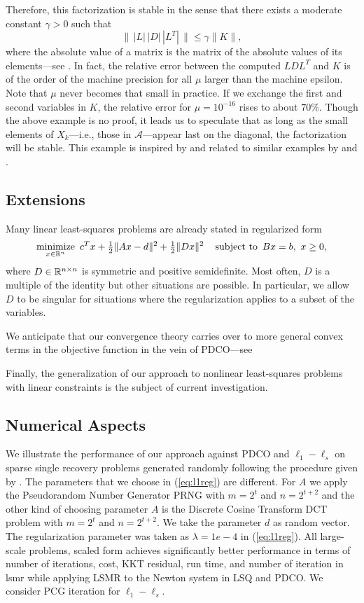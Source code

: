 \documentclass{amsart}
\begin{document}
Therefore, this factorization is stable in the sense that there exists a
moderate constant $\gamma > 0$ such that
\[
  \| \, |L| \, |D| \, |L^T| \, \| \leq \gamma \|K\|,
\]
where the absolute value of a matrix is the matrix of the absolute values of
its elements---see \cite{golub-vanloan-1996}. In fact, the relative error
between the computed $LDL^T$ and $K$ is of the order of the machine precision for
all $\mu$ larger than the machine epsilon. Note that $\mu$ never becomes that
small in practice. If we exchange the first and second variables in $K$, the
relative error for $\mu = 10^{-16}$ rises to about $70\%$. Though the above
example is no proof, it leads us to speculate that as long as the small
elements of $X_k$---i.e., those in $\mathcal{A}$---appear last on the diagonal,
the factorization will be stable. This example is inspired by and related to
similar examples by \cite{vanderbei-1995} and
\cite{gill-saunders-shinnerl-1996}.

\subsection{Extensions}

Many linear least-squares problems are already stated in regularized form
\begin{equation}
  \label{eq:reg-lsq}
  \displaystyle\mathop{\textup{minimize}}_{x \in \mathbb{R}^n} \ c^T x + \tfrac{1}{2} \|Ax - d\|^2 + \tfrac{1}{2} \|Dx\|^2 \quad
  \mathop{\textup{subject to}} \ Bx = b, \ x \geq 0,
\end{equation}
where $D \in \mathbb{R}^{n \times n}$ is symmetric and positive semidefinite. Most
often, $D$ is a multiple of the identity but other situations are possible. In
particular, we allow $D$ to be singular for situations where the regularization
applies to a subset of the variables.

We anticipate that our convergence theory carries over to more general convex
terms in the objective function in the vein  of PDCO---see

Finally, the generalization of our approach to nonlinear least-squares
problems with linear constraints is the subject of current investigation.
\subsection{Numerical Aspects}

 We illustrate the performance of our approach against PDCO and $\ell_1-\ell_s$  on sparse single recovery problems generated randomly following the procedure given by \cite{kim-koh-lustig-boyd-gorinevsky-2007}. 
The parameters that we choose in (\ref{eq:l1reg}) are different. For $A$ we apply the Pseudorandom Number Generator PRNG with $m=2^t$ and $n=2^{t+2}$ and the other kind of choosing parameter $A$ is the Discrete Cosine Transform DCT problem with $m=2^t$ and $n=2^{t+2}$. We take the parameter $d$ as random vector. The regularization parameter  was taken as $\lambda =1e-4$ in (\ref{eq:l1reg}).
All large-scale  problems,  scaled form  achieves significantly better performance in terms of   number of iterations, cost, KKT residual, run time, and number of iteration in lsmr   while applying LSMR to the Newton system in LSQ and PDCO. We consider  PCG iteration for $\ell_1-\ell_s$.






\end{document}
